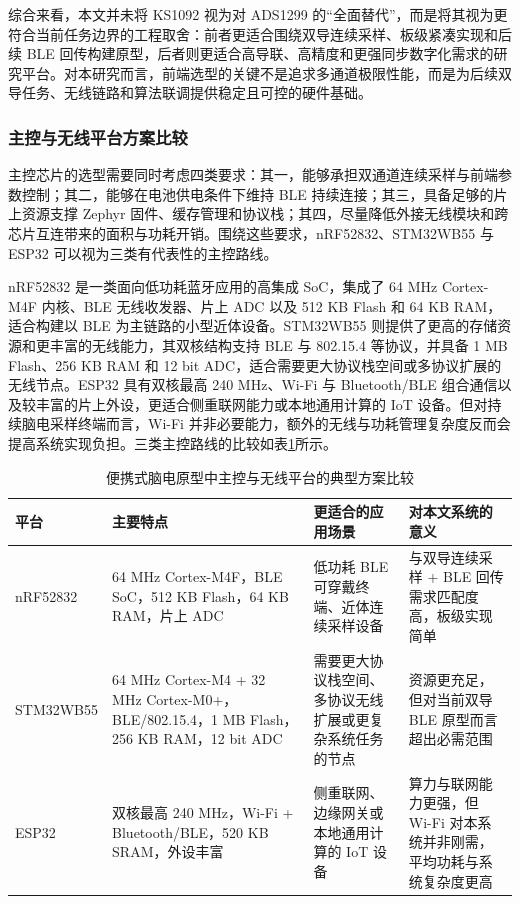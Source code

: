 综合来看，本文并未将 KS1092 视为对 ADS1299 的“全面替代”，而是将其视为更符合当前任务边界的工程取舍：前者更适合围绕双导连续采样、板级紧凑实现和后续 BLE 回传构建原型，后者则更适合高导联、高精度和更强同步数字化需求的研究平台。对本研究而言，前端选型的关键不是追求多通道极限性能，而是为后续双导任务、无线链路和算法联调提供稳定且可控的硬件基础。

\subsubsection{主控与无线平台方案比较}

主控芯片的选型需要同时考虑四类要求：其一，能够承担双通道连续采样与前端参数控制；其二，能够在电池供电条件下维持 BLE 持续连接；其三，具备足够的片上资源支撑 Zephyr 固件、缓存管理和协议栈；其四，尽量降低外接无线模块和跨芯片互连带来的面积与功耗开销。围绕这些要求，nRF52832、STM32WB55 与 ESP32 可以视为三类有代表性的主控路线。

nRF52832 是一类面向低功耗蓝牙应用的高集成 SoC，集成了 64 MHz Cortex-M4F 内核、BLE 无线收发器、片上 ADC 以及 512 KB Flash 和 64 KB RAM，适合构建以 BLE 为主链路的小型近体设备\cite{nrf52832_nordic}。STM32WB55 则提供了更高的存储资源和更丰富的无线能力，其双核结构支持 BLE 与 802.15.4 等协议，并具备 1 MB Flash、256 KB RAM 和 12 bit ADC，适合需要更大协议栈空间或多协议扩展的无线节点\cite{stm32wb55_st}。ESP32 具有双核最高 240 MHz、Wi-Fi 与 Bluetooth/BLE 组合通信以及较丰富的片上外设，更适合侧重联网能力或本地通用计算的 IoT 设备\cite{esp32_espressif}。但对持续脑电采样终端而言，Wi-Fi 并非必要能力，额外的无线与功耗管理复杂度反而会提高系统实现负担。三类主控路线的比较如表\ref{tab:c3_mcu_compare}所示。

\begin{table}[htbp]
    \centering
    \caption{便携式脑电原型中主控与无线平台的典型方案比较}
    \label{tab:c3_mcu_compare}
    \begin{tabular}{p{2.8cm}p{3.8cm}p{3.6cm}p{4.1cm}}
        \hline
        平台 & 主要特点 & 更适合的应用场景 & 对本文系统的意义 \\
        \hline
        nRF52832 & 64 MHz Cortex-M4F，BLE SoC，512 KB Flash，64 KB RAM，片上 ADC\cite{nrf52832_nordic} & 低功耗 BLE 可穿戴终端、近体连续采样设备 & 与双导连续采样 + BLE 回传需求匹配度高，板级实现简单 \\
        STM32WB55 & 64 MHz Cortex-M4 + 32 MHz Cortex-M0+，BLE/802.15.4，1 MB Flash，256 KB RAM，12 bit ADC\cite{stm32wb55_st} & 需要更大协议栈空间、多协议无线扩展或更复杂系统任务的节点 & 资源更充足，但对当前双导 BLE 原型而言超出必需范围 \\
        ESP32 & 双核最高 240 MHz，Wi-Fi + Bluetooth/BLE，520 KB SRAM，外设丰富\cite{esp32_espressif} & 侧重联网、边缘网关或本地通用计算的 IoT 设备 & 算力与联网能力更强，但 Wi-Fi 对本系统并非刚需，平均功耗与系统复杂度更高 \\
        \hline
    \end{tabular}
\end{table}


